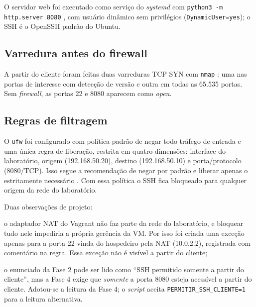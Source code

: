 O servidor web foi executado como serviço do \textit{systemd} com
\texttt{python3 -m http.server 8080} \cite{python-httpserver}, com usuário dinâmico sem
privilégios (\texttt{DynamicUser=yes}); o SSH é o OpenSSH padrão do Ubuntu.



\subsection{Varredura antes do firewall}

A partir do cliente foram feitas duas varreduras TCP SYN com \texttt{nmap}
\cite{lyon2009nmap}: uma nas portas de interesse com detecção de versão e outra em todas as
65.535 portas. Sem \textit{firewall}, as portas 22 e 8080 aparecem como \emph{open}.



\subsection{Regras de filtragem}

O \texttt{ufw} \cite{ufw-docs} foi configurado com política padrão de negar todo tráfego
de entrada e uma única regra de liberação, restrita em quatro dimensões: interface do
laboratório, origem (192.168.50.20), destino (192.168.50.10) e porta/protocolo
(8080/TCP). Isso segue a recomendação de negar por padrão e liberar apenas o
estritamente necessário \cite{nist80041}. Com essa política o SSH fica bloqueado para
qualquer origem da rede do laboratório.

Duas observações de projeto:
\begin{alineas}
  \item o adaptador NAT do Vagrant não faz parte da rede do laboratório, e bloquear tudo
    nele impediria a própria gerência da VM. Por isso foi criada uma exceção apenas para a
    porta 22 vinda do hospedeiro pela NAT (10.0.2.2), registrada com comentário na regra.
    Essa exceção não é visível a partir do cliente;
  \item o enunciado da Fase 2 pode ser lido como ``SSH permitido somente a partir do
    cliente'', mas a Fase 4 exige que \emph{somente} a porta 8080 esteja acessível a partir
    do cliente. Adotou-se a leitura da Fase 4; o \textit{script} aceita
    \texttt{PERMITIR\_SSH\_CLIENTE=1} para a leitura alternativa.
\end{alineas}

